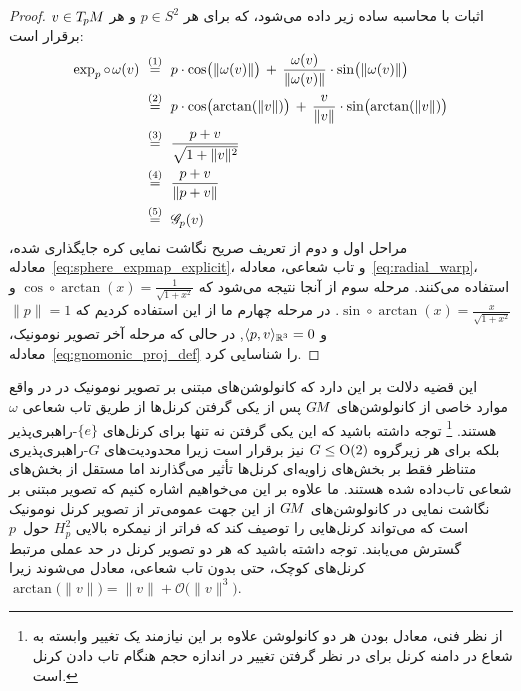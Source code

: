 \begin{proof}
    اثبات با محاسبه ساده زیر داده می‌شود، که برای هر $p\in S^2$ و هر $v\in T_{\mkern-1.5mu p}\mkern-.5muM$ برقرار است:
    \begin{align}
        \exp_p \circ\mkern2mu \omega (v)
        \ &\overset{(1)}{=}\ p\cdot \cos\! \big(\lVert \omega(v)\rVert\big) \,+\, \frac{\omega(v)}{\lVert \omega(v)\rVert}\cdot \sin\! \big(\lVert \omega(v)\rVert\big) \notag \\
        \ &\overset{(2)}{=}\ p\cdot \cos\! \big(\!\arctan(\lVert v\rVert)\big) \,+\, \frac{v}{\lVert v\rVert}\cdot \sin\! \big(\!\arctan(\lVert v\rVert)\big) \notag \\
        \ &\overset{(3)}{=}\ \frac{p+v}{\sqrt{1+\lVert v\rVert^2}} \notag \\
        \ &\overset{(4)}{=}\ \frac{p+v}{\lVert p+v\rVert} \notag \\
        \ &\overset{(5)}{=}\ \mathscr{G}_p(v)
    \end{align}
    مراحل اول و دوم از تعریف صریح نگاشت نمایی کره جایگذاری شده، معادله~\eqref{eq:sphere_expmap_explicit}، و تاب شعاعی، معادله~\eqref{eq:radial_warp}، استفاده می‌کنند.
    مرحله سوم از آنجا نتیجه می‌شود که $\cos \circ \arctan(x) = \frac{1}{\sqrt{1+x^2}}$ و $\sin \circ \arctan(x) = \frac{x}{\sqrt{1+x^2}}$.
    در مرحله چهارم ما از این استفاده کردیم که $\lVert p\rVert = 1$ و $\langle p,v\rangle_{\mathbb{R}^3} = 0$, در حالی که مرحله آخر تصویر نومونیک، معادله~\eqref{eq:gnomonic_proj_def} را شناسایی کرد.
\end{proof}
این قضیه دلالت بر این دارد که کانولوشن‌های مبتنی بر تصویر نومونیک در
\cite{coors2018spherenet,zhao2018distortion,tateno2018distortion,eder2019convolutions,martin2020panoramic}
در واقع موارد خاصی از کانولوشن‌های $G\mkern-1.4muM$ پس از یکی گرفتن کرنل‌ها از طریق تاب شعاعی $\omega$ هستند.%
\footnote{
    از نظر فنی، معادل بودن هر دو کانولوشن علاوه بر این نیازمند یک تغییر وابسته به شعاع در دامنه کرنل برای در نظر گرفتن تغییر در اندازه حجم هنگام تاب دادن کرنل است.
}
توجه داشته باشید که این یکی گرفتن نه تنها برای کرنل‌های $\{e\}$-راهبری‌پذیر بلکه برای هر زیرگروه $G\leq\operatorname{O}(2)$ نیز برقرار است زیرا محدودیت‌های $G$-راهبری‌پذیری متناظر فقط بر بخش‌های زاویه‌ای کرنل‌ها تأثیر می‌گذارند اما مستقل از بخش‌های شعاعی تاب‌داده شده هستند.
ما علاوه بر این می‌خواهیم اشاره کنیم که تصویر مبتنی بر نگاشت نمایی در کانولوشن‌های $G\mkern-1.4muM$ از این جهت عمومی‌تر از تصویر کرنل نومونیک است که می‌تواند کرنل‌هایی را توصیف کند که فراتر از نیمکره بالایی $H_p^2$ حول~$p$ گسترش می‌یابند.
توجه داشته باشید که هر دو تصویر کرنل در حد عملی مرتبط کرنل‌های کوچک، حتی بدون تاب شعاعی، معادل می‌شوند زیرا $\arctan\big(\lVert v\rVert\big) = \lVert v\rVert + \mathcal{O}\big(\lVert v\rVert^3\big)$.

